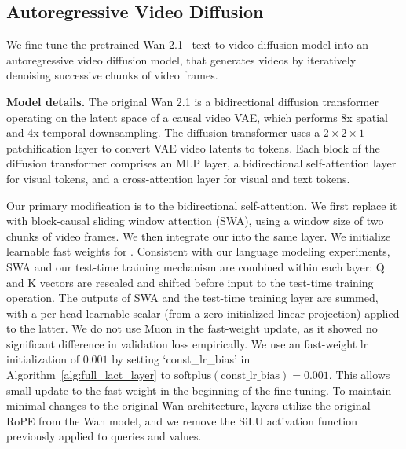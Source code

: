 \subsection{Autoregressive Video Diffusion}
\label{sec:appen_exp_video}
We fine-tune the pretrained Wan 2.1~\cite{wang2025wan} text-to-video diffusion model into an autoregressive video diffusion model, that generates videos by iteratively denoising successive chunks of video frames.



\noindent\textbf{Model details.}  The original Wan 2.1 is a bidirectional diffusion transformer operating on the latent space of a causal video VAE, which performs 8x spatial and 4x temporal downsampling. The diffusion transformer uses a $2\times2\times1$ patchification layer to convert VAE video latents to tokens.   Each block of the diffusion transformer comprises an MLP layer, a bidirectional self-attention layer for visual tokens, and a cross-attention layer for visual and text tokens. 



Our primary modification is to the bidirectional self-attention. We first replace it with block-causal sliding window attention (SWA), using a window size of two chunks of video frames. We then integrate our \methodname{} into the same layer. We initialize learnable fast weights for \methodname{}. Consistent with our language modeling experiments, SWA and our test-time training mechanism are combined within each layer: Q and K vectors are rescaled and shifted before input to the test-time training operation. The outputs of SWA and the test-time training layer are summed, with a per-head learnable scalar (from a zero-initialized linear projection) applied to the latter. We do not use Muon in the fast-weight update, as it showed no significant difference in validation loss empirically. 
We use an fast-weight lr initialization of $0.001$ by setting `const\_lr\_bias' in Algorithm~\ref{alg:full_lact_layer} to $\mathrm{softplus}(\text{const\_lr\_bias}) = 0.001$.
This allows small update to the fast weight in the beginning of the fine-tuning.  To maintain minimal changes to the original Wan architecture, \methodname{} layers utilize the original RoPE from the Wan model, and we remove the SiLU activation function previously applied to queries and values.
 
